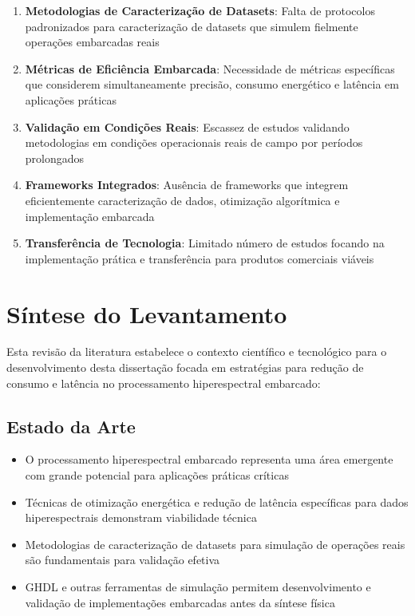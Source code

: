 \begin{enumerate}
    \item \textbf{Metodologias de Caracterização de Datasets}: Falta de protocolos padronizados para caracterização de datasets que simulem fielmente operações embarcadas reais
    \item \textbf{Métricas de Eficiência Embarcada}: Necessidade de métricas específicas que considerem simultaneamente precisão, consumo energético e latência em aplicações práticas
    \item \textbf{Validação em Condições Reais}: Escassez de estudos validando metodologias em condições operacionais reais de campo por períodos prolongados
    \item \textbf{Frameworks Integrados}: Ausência de frameworks que integrem eficientemente caracterização de dados, otimização algorítmica e implementação embarcada
    \item \textbf{Transferência de Tecnologia}: Limitado número de estudos focando na implementação prática e transferência para produtos comerciais viáveis
\end{enumerate}

\section{Síntese do Levantamento}\label{sec:sintese}

Esta revisão da literatura estabelece o contexto científico e tecnológico para o desenvolvimento desta dissertação focada em estratégias para redução de consumo e latência no processamento hiperespectral embarcado:

\subsection{Estado da Arte}
\begin{itemize}
    \item O processamento hiperespectral embarcado representa uma área emergente com grande potencial para aplicações práticas críticas
    \item Técnicas de otimização energética e redução de latência específicas para dados hiperespectrais demonstram viabilidade técnica
    \item Metodologias de caracterização de datasets para simulação de operações reais são fundamentais para validação efetiva
    \item GHDL e outras ferramentas de simulação permitem desenvolvimento e validação de implementações embarcadas antes da síntese física
\end{itemize}

